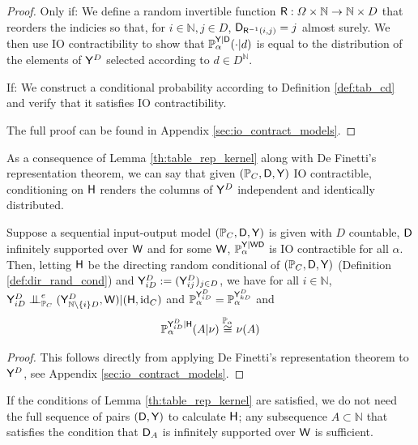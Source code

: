 \begin{proof}
Only if: We define a random invertible function $\mathsf{R}:\Omega\times \mathbb{N}\to \mathbb{N}\times {D}$ that reorders the indicies so that, for $i\in \mathbb{N},j\in D$, $\mathsf{D}_{\mathsf{R}^{-1}(i,j)}=j$ almost surely. We then use IO contractibility to show that $\mathbb{P}_\alpha^{\mathsf{Y}|\mathsf{D}}(\cdot|d)$ is equal to the distribution of the elements of $\mathsf{Y}^D$ selected according to $d\in D^{\mathbb{N}}$.

If: We construct a conditional probability according to Definition \ref{def:tab_cd} and verify that it satisfies IO contractibility.

The full proof can be found in Appendix \ref{sec:io_contract_models}.
\end{proof}

As a consequence of Lemma \ref{th:table_rep_kernel} along with De Finetti's representation theorem, we can say that given $(\mathbb{P}_C,\mathsf{D},\mathsf{Y})$ IO contractible, conditioning on $\mathsf{H}$ renders the columns of $\mathsf{Y}^D$ independent and identically distributed.

\begin{lemma}\label{lem:ciid_yd}
Suppose a sequential input-output model $(\mathbb{P}_C,\mathsf{D},\mathsf{Y})$ is given with $D$ countable, $\mathsf{D}$ infinitely supported over $\mathsf{W}$ and for some $\mathsf{W}$, $\mathbb{P}_\alpha^{\mathsf{Y}|\mathsf{WD}}$ is IO contractible for all $\alpha$. Then, letting $\mathsf{H}$ be the directing random conditional of $(\mathbb{P}_C,\mathsf{D},\mathsf{Y})$ (Definition \ref{def:dir_rand_cond}) and $\mathsf{Y}^D_{iD}:=(\mathsf{Y}^D_{ij})_{j\in D}$, we have for all $i\in\mathbb{N}$, $\RV{Y}^D_{iD}\CI^e_{\prob{P}_C} (\RV{Y}^D_{\mathbb{N}\setminus\{i\}D},\RV{W}) | (\RV{H},\text{id}_C)$ and $\mathbb{P}_\alpha^{\mathsf{Y}^D_{iD}} = \mathbb{P}_\alpha^{\mathsf{Y}^D_{kD}}$ and
\begin{align}
    \mathbb{P}_\alpha^{\mathsf{Y}^D_{iD}|\mathsf{H}}(A|\nu) \overset{\mathbb{P}_\alpha}{\cong} \nu(A)
\end{align}
\end{lemma}

\begin{proof}
This follows directly from applying De Finetti's representation theorem to $\mathsf{Y}^D$, see Appendix \ref{sec:io_contract_models}.
\end{proof}

If the conditions of Lemma \ref{th:table_rep_kernel} are satisfied, we do not need the full sequence of pairs $(\mathsf{D},\mathsf{Y})$ to calculate $\mathsf{H}$; any subsequence $A\subset\mathbb{N}$ that satisfies the condition that $\mathsf{D}_A$ is infinitely supported over $\mathsf{W}$ is sufficient.

